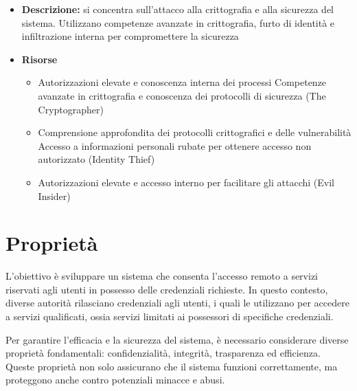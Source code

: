 \begin{itemize}
\begin{itemize}
                \item \textbf{Descrizione:} si concentra sull'attacco alla crittografia e alla sicurezza del sistema.
                Utilizzano competenze avanzate in crittografia, furto di identità e infiltrazione interna per compromettere la sicurezza

                \item \textbf{Risorse}
                    \begin{itemize}
                        \item Autorizzazioni elevate e conoscenza interna dei processi Competenze avanzate in crittografia e conoscenza dei protocolli di sicurezza (The Cryptographer)
                        
                        \vspace{3mm}

                        \item Comprensione approfondita dei protocolli crittografici e delle vulnerabilità Accesso a informazioni personali rubate per ottenere accesso non autorizzato (Identity Thief)

                        \vspace{3mm}

                        \item Autorizzazioni elevate e accesso interno per facilitare gli attacchi (Evil Insider)
                    \end{itemize}
            \end{itemize}
        
    \end{itemize}


\section{Proprietà}
    L'obiettivo è sviluppare un sistema che consenta l'accesso remoto a servizi riservati agli utenti in possesso delle credenziali richieste.
    In questo contesto, diverse autorità rilasciano credenziali agli utenti, i quali le utilizzano per accedere a servizi qualificati, ossia servizi limitati ai possessori di specifiche credenziali.
    
    Per garantire l'efficacia e la sicurezza del sistema, è necessario considerare diverse proprietà fondamentali: confidenzialità, integrità, trasparenza ed efficienza.
    Queste proprietà non solo assicurano che il sistema funzioni correttamente, ma proteggono anche contro potenziali minacce e abusi.

